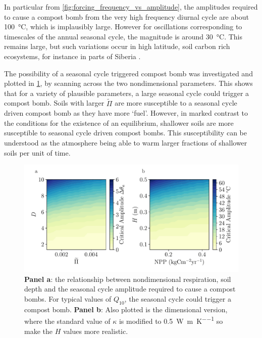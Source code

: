 In particular from \cref{fig:forcing_frequency_vs_amplitude}, 
the amplitudes required to cause a compost bomb from the very high frequency diurnal cycle are about \SI{100}{\degreeCelsius}, which is implausibly large.
However for oscillations corresponding to timescales of the annual seasonal cycle, the magnitude is around \SI{30}{\degreeCelsius}. This remains large,
but such variations occur in high latitude, soil carbon rich ecosystems, for instance in parts of Siberia \parencite{Peixoto1992}.

The possibility of a seasonal cycle triggered compost bomb was investigated and plotted in \cref{fig:critical_amplitude_to_be_triggered_by_the_seasonal_cycle},
by scanning across the two nondimensional parameters.
This shows that for a variety of plausible parameters, a large seasonal cycle could trigger a compost bomb. Soils with larger $\widetilde{\Pi}$ are more susceptible to a seasonal
cycle driven compost bomb as they have more `fuel'. However, in marked contrast to the conditions for the existence of an equilibrium, shallower soils are more susceptible to seasonal cycle driven
compost bombs. This susceptibility can be understood as the atmosphere being able to warm larger fractions of shallower soils per unit of time.


\begin{figure}
  \centering
  \includegraphics[width=\textwidth,keepaspectratio]{seasonal_dim_and_nondim}
  \caption[Critical seasonal cycle for a compost bomb]{\textbf{Panel a}: the relationship between nondimensional respiration, soil depth and the seasonal cycle amplitude required to cause a compost bombs.
    For typical values of $Q_{10}$, the seasonal cycle could trigger a compost bomb. \textbf{Panel b}: Also plotted is the dimensional version, where the standard value
    of $\kappa$ is modified to \SI{0.5}{\watt\per\meter\per\kelvin} so make the $H$ values more realistic.}
  \label{fig:critical_amplitude_to_be_triggered_by_the_seasonal_cycle}
\end{figure}

